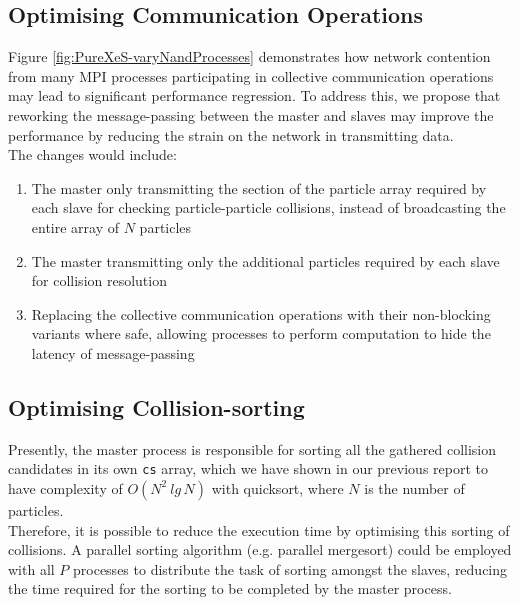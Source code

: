 \documentclass[12pt]{article}
\begin{document}
\subsection{Optimising Communication Operations}
Figure \ref{fig:PureXeS-varyNandProcesses} demonstrates how network contention from many MPI processes participating in collective communication operations may lead to significant performance regression. To address this, we propose that reworking the message-passing between the master and slaves may improve the performance by reducing the strain on the network in transmitting data.\\

The changes would include:
\begin{enumerate}[label=(\arabic*)]
\item The master only transmitting the section of the particle array required by each slave for checking particle-particle collisions, instead of broadcasting the entire array of $N$ particles
\item The master transmitting only the additional particles required by each slave for collision resolution
\item Replacing the collective communication operations with their non-blocking variants where safe, allowing processes to perform computation to hide the latency of message-passing
\end{enumerate}

\subsection{Optimising Collision-sorting}
Presently, the master process is responsible for sorting all the gathered collision candidates in its own \texttt{cs} array, which we have shown in our previous report \cite{assign1bref} to have complexity of $O(N^2\:lg\,N)$ with quicksort, where $N$ is the number of particles.\\

Therefore, it is possible to reduce the execution time by optimising this sorting of collisions. A parallel sorting algorithm (e.g. parallel mergesort) could be employed with all $P$ processes to distribute the task of sorting amongst the slaves, reducing the time required for the sorting to be completed by the master process.
\pagebreak



\end{document}
